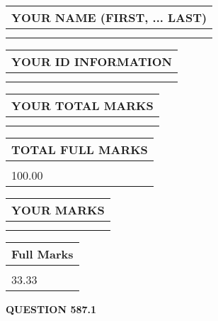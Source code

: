 \documentclass{ctexart}
\begin{document}
   
   
   
\newpage 
\setcounter{page}{ 
   587001 } 
   
   
   
   
\noindent\begin{tabular}{|l|}
\hline
YOUR NAME (FIRST, ... LAST)  \\
\hline
 \\ 
 \\ 
\hline
\end{tabular}
\hspace{0.05in} \begin{tabular}{|l|}
\hline
 YOUR   ID   INFORMATION  \\
\hline
 \\ 
 \\ 
\hline
\end{tabular}
   
   
\vspace{0.2in}\noindent\begin{tabular}{|l|}
\hline
YOUR TOTAL MARKS  \\
\hline
 \\ 
 \\ 
\hline
\end{tabular}
\hspace{0.05in} \begin{tabular}{|l|}
\hline
TOTAL FULL MARKS  \\
\hline
 \\ 
100.00 \\
\hline
\end{tabular}
   
   
 \vspace{0.2in}
 
 
 
 
   
   
  
\vspace{0.2in}
  
\noindent\begin{tabular}{|l|}
\hline
 YOUR MARKS  \\
\hline
 \\ 
 \\ 
\hline
\end{tabular}
\hspace{0.05in} \begin{tabular}{|l|}
\hline
 Full Marks  \\
\hline
 \\ 
33.33 \\
\hline
\end{tabular}
{\textbf{\Large{QUESTION
587.1 
}}}
  
\end{document}

